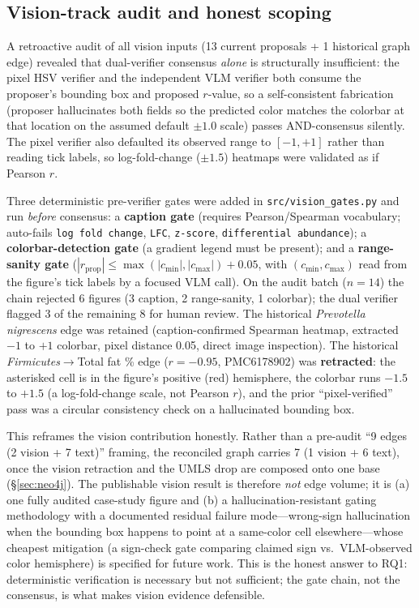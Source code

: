 \documentclass[10pt,twocolumn,letterpaper]{article}
\begin{document}
\subsection{Vision-track audit and honest scoping}
\label{sec:visionaudit}

A retroactive audit of all vision inputs (13 current proposals + 1 historical
graph edge) revealed that dual-verifier consensus \emph{alone} is
structurally insufficient: the pixel HSV verifier and the independent VLM
verifier both consume the proposer's bounding box and proposed $r$-value, so
a self-consistent fabrication (proposer hallucinates both fields so the
predicted color matches the colorbar at that location on the assumed default
$\pm1.0$ scale) passes AND-consensus silently. The pixel verifier also
defaulted its observed range to $[-1,+1]$ rather than reading tick labels, so
log-fold-change ($\pm1.5$) heatmaps were validated as if Pearson $r$.

Three deterministic pre-verifier gates were added in
\texttt{src/vision\_gates.py} and run \emph{before} consensus: a
\textbf{caption gate} (requires Pearson/Spearman vocabulary; auto-fails
\texttt{log fold change}, \texttt{LFC}, \texttt{z-score}, \texttt{differential
abundance}); a \textbf{colorbar-detection gate} (a gradient legend must be
present); and a \textbf{range-sanity gate}
($|r_{\text{prop}}|\leq\max(|c_{\min}|,|c_{\max}|)+0.05$, with
$(c_{\min},c_{\max})$ read from the figure's tick labels by a focused VLM
call). On the audit batch ($n{=}14$) the chain rejected 6 figures (3 caption,
2 range-sanity, 1 colorbar); the dual verifier flagged 3 of the remaining 8
for human review. The historical \textit{Prevotella nigrescens} edge was
retained (caption-confirmed Spearman heatmap, extracted $-1$ to $+1$
colorbar, pixel distance 0.05, direct image inspection). The historical
\textit{Firmicutes}$\rightarrow$Total fat \% edge ($r=-0.95$, PMC6178902) was
\textbf{retracted}: the asterisked cell is in the figure's positive (red)
hemisphere, the colorbar runs $-1.5$ to $+1.5$ (a log-fold-change scale, not
Pearson $r$), and the prior ``pixel-verified'' pass was a circular
consistency check on a hallucinated bounding box.

This reframes the vision contribution honestly. Rather than a pre-audit ``9
edges (2 vision + 7 text)'' framing, the reconciled graph carries 7 (1 vision
+ 6 text), once the vision retraction and the UMLS drop are composed onto one
base (\S\ref{sec:neo4j}). The publishable vision result is therefore
\emph{not} edge volume;
it is (a) one fully audited case-study figure and (b) a hallucination-resistant
gating methodology with a documented residual failure mode---wrong-sign
hallucination when the bounding box happens to point at a same-color cell
elsewhere---whose cheapest mitigation (a sign-check gate comparing claimed
sign vs.\ VLM-observed color hemisphere) is specified for future work. This is
the honest answer to RQ1: deterministic verification is necessary but not
sufficient; the gate chain, not the consensus, is what makes vision evidence
defensible.
\end{document}
